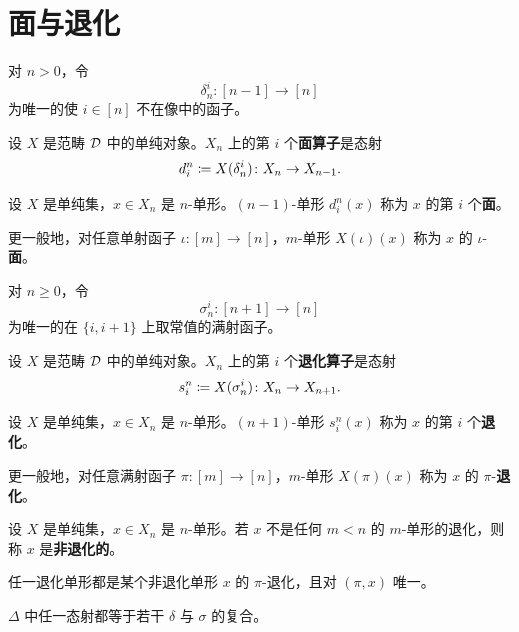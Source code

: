 \section{面与退化}

\begin{definition}\label{L3-2.1}
对 $n>0$，令
\[
\delta^{i}_{n}\colon[n-1]\to[n]
\]
为唯一的使 $i\in[n]$ 不在像中的函子。

设 $X$ 是范畴 $\mathcal{D}$ 中的单纯对象。$X_{n}$ 上的第 $i$ 个\textbf{面算子}是态射
\[
d^{n}_{i}\coloneqq X(\delta^{i}_{n})\colon X_{n}\to X_{n-1}.
\]
\end{definition}

\begin{definition}\label{L3-2.2}
设 $X$ 是单纯集，$x\in X_{n}$ 是 $n$-单形。$(n-1)$-单形 $d^{n}_{i}(x)$ 称为 $x$ 的第 $i$ 个\textbf{面}。

更一般地，对任意单射函子 $\iota\colon[m]\to[n]$，$m$-单形 $X(\iota)(x)$ 称为 $x$ 的 $\iota$-\textbf{面}。
\end{definition}

\begin{definition}\label{L3-2.3}
对 $n\ge 0$，令
\[
\sigma^{i}_{n}\colon[n+1]\to[n]
\]
为唯一的在 $\{i,i+1\}$ 上取常值的满射函子。

设 $X$ 是范畴 $\mathcal{D}$ 中的单纯对象。$X_{n}$ 上的第 $i$ 个\textbf{退化算子}是态射
\[
s^{n}_{i}\coloneqq X(\sigma^{i}_{n})\colon X_{n}\to X_{n+1}.
\]
\end{definition}

\begin{definition}\label{L3-2.4}
设 $X$ 是单纯集，$x\in X_{n}$ 是 $n$-单形。$(n+1)$-单形 $s^{n}_{i}(x)$ 称为 $x$ 的第 $i$ 个\textbf{退化}。

更一般地，对任意满射函子 $\pi\colon[m]\to[n]$，$m$-单形 $X(\pi)(x)$ 称为 $x$ 的 $\pi$-\textbf{退化}。
\end{definition}

\begin{definition}\label{L3-2.5}
设 $X$ 是单纯集，$x\in X_{n}$ 是 $n$-单形。若 $x$ 不是任何 $m<n$ 的 $m$-单形的退化，则称 $x$ 是\textbf{非退化的}。
\end{definition}

\begin{lemma}\label{L3-2.6}
任一退化单形都是某个非退化单形 $x$ 的 $\pi$-退化，且对 $(\pi,x)$ 唯一。
\end{lemma}

\begin{exercise}\label{L3-2.7}
$\Delta$ 中任一态射都等于若干 $\delta$ 与 $\sigma$ 的复合。
\end{exercise}

